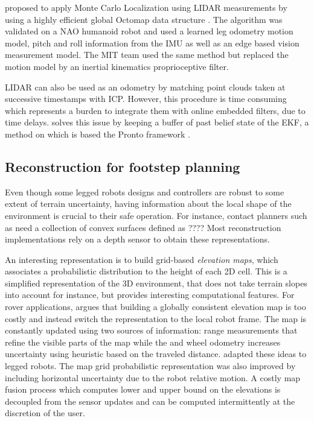 \cite{hornung2014monte} proposed to apply Monte Carlo Localization using LIDAR measurements by using a highly efficient global Octomap data structure \cite{hornung2013octomap}.
The algorithm was validated on a NAO humanoid robot and used a learned leg odometry motion model, pitch and roll information from the IMU as well as an edge based vision measurement model.
The MIT team \cite{fallon2014drift} used the same method but replaced the motion model by an inertial kinematics proprioceptive filter. 

LIDAR can also be used as an odometry by matching point clouds taken at successive timestamps with ICP. However, this procedure is time consuming 
which represents a burden to integrate them with online embedded filters, due to time delays. \cite{nobili2017heterogeneous} solves this issue by keeping a
buffer of past belief state of the EKF, a method on which is based the Pronto framework \cite{camurri2020pronto}.



\subsection{Reconstruction for footstep planning}
Even though some legged robots designs and controllers \cite{reher2019dynamic, bledt2018cheetah} are robust to some extent of terrain uncertainty, having information about the local
shape of the environment is crucial to their safe operation. For instance, contact planners such as \cite{tonneau2018efficient} need a collection of convex surfaces defined as ????
Most reconstruction implementations rely on a depth sensor to obtain these representations.

An interesting representation is to build grid-based \textit{elevation maps}, which associates a probabilistic distribution to the height of each 2D cell. 
This is a simplified representation of the 3D environment, that does not take terrain slopes into account for instance, but provides interesting computational features. 
For rover applications, \cite{kleiner2007real} argues that building a globally consistent elevation map is too costly and instead switch the representation to the local robot frame. 
The map is constantly updated using two sources of information: range measurements that refine the visible parts of the map while the and wheel odometry increases uncertainty using heuristic
based on the traveled distance. \cite{fankhauser2014robot, fankhauser2018probabilistic} adapted these ideas to legged robots. The map grid probabilistic representation
was also improved by including horizontal uncertainty due to the robot relative motion. A costly map fusion process which computes lower and upper bound on the elevations
is decoupled from the sensor updates and can be computed intermittently at the discretion of the user. 

